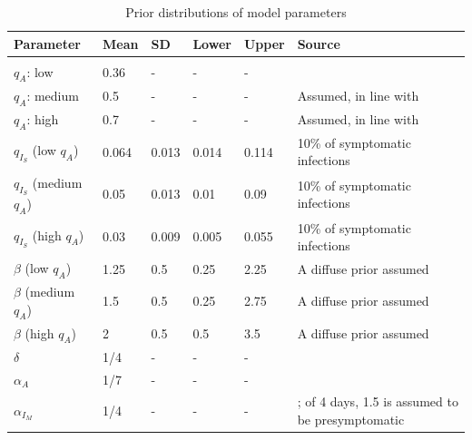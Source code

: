 \documentclass[11pt]{article}
\begin{document}
\begingroup
\renewcommand\arraystretch{0.5}
\begin{table}[!htb] 
\caption{Prior distributions of model parameters}
\vspace{.5em}
\centering
\begin{tabular}{p{} p{} p{} p{} p{} p{} }
\toprule
		Parameter & Mean & SD & Lower & Upper & Source  \\\hline \\[0.1em]
		$q_A$: low & 0.36 & {-} & {-} & {-} & \citep{nishiura2020estimation, mizumoto2020estimating, russell2020estimating}  \\[0.5em]
		$q_A$: medium & 0.5 & {-} & {-} & {-} & Assumed, in line with \citep{he2020estimation, emery2020contribution, kimball2020asymptomatic} \\[0.5em]
		$q_A$: high & 0.7  & {-} & {-} & {-} & Assumed, in line with \citep{he2020estimation, emery2020contribution, kimball2020asymptomatic} \\[0.5em]
		$q_{I_S}$ (low $q_A$) & 0.064 & 0.013 & 0.014 & 0.114 & 10\% of symptomatic infections \citep{verity2020estimates, bi2020epidemiology, salje2020estimating, lane2020country} \\[0.5em]
		$q_{I_S}$ (medium $q_A$) & 0.05 & 0.013 & 0.01 & 0.09 & 10\% of symptomatic infections \citep{verity2020estimates, bi2020epidemiology, salje2020estimating} \\[0.5em]
		$q_{I_S}$ (high $q_A$) & 0.03 & 0.009 & 0.005 & 0.055 & 10\% of symptomatic infections \citep{verity2020estimates, bi2020epidemiology, salje2020estimating} \\[0.5em]
		$\beta$ (low $q_A$) & 1.25 & 0.5 & 0.25 & 2.25 & A diffuse prior assumed \\[0.5em]
		$\beta$ (medium $q_A$) & 1.5 & 0.5 & 0.25 & 2.75 & A diffuse prior assumed \\[0.5em]
		$\beta$ (high $q_A$) & 2 & 0.5 & 0.5 & 3.5 & A diffuse prior assumed \\[0.5em]
		$\delta$ & 1/4 & {-} & {-} & {-} & \citep{lauer2020incubation, bi2020epidemiology, li2020early, linton2020incubation, he2020estimation, salje2020estimating, wei2020presymptomatic} \\[0.5em]
		$\alpha_A$ & 1/7 & {-} & {-} & {-} & \citep{wolfel2020virological, cdc2020isolation, yang2020comparison} \\[0.5em]
		$\alpha_{I_M}$ & 1/4 & {-} & {-} & {-} & \citep{salje2020estimating, li2020substantial, kissler2020projecting}; of 4 days, 1.5 is assumed to be presymptomatic \citep{wei2020presymptomatic} \\[0.5em]

\end{tabular}
\end{table}
\end{document}

